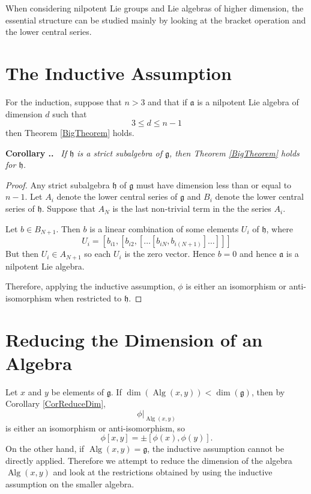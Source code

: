 \documentclass[honours]{UNSWthesis}
\newcommand{\g}{\mathfrak{g}}
\newcommand{\1}{\mathbf{e}_{1}}
\newcommand{\2}{\mathbf{e}_{3}}
\newcommand{\3}{\mathbf{e}_{3}}
\DeclareMathOperator{\alg}{Alg}
\newcounter{Item}[section]
\newenvironment{Corollary}{\medskip
                            \refstepcounter{Item}
                            \noindent
                           {\bf Corollary \thesection.\theItem.}\ %
                            \begingroup \sl}
                           {\endgroup\medskip}
\begin{document}




When considering nilpotent Lie groups and Lie algebras of higher dimension, the essential structure can be studied mainly by looking at the bracket operation and the lower central series.




\section{The Inductive Assumption}
For the induction, suppose that $n > 3$ and that if $\mathfrak{a}$ is a nilpotent Lie algebra of dimension $d$ such that
\[
3 \leq d \leq n-1
\]
then Theorem \ref{BigTheorem} holds. 

\begin{Corollary}\label{CorReduceDim}
If $\mathfrak{h}$ is a strict subalgebra of $\g$, then Theorem \ref{BigTheorem} holds for $\mathfrak{h}$. 
\end{Corollary}

\begin{proof}
Any strict subalgebra $\mathfrak{h}$ of $\g$ must have dimension less than or equal to $n-1$. Let $A_{i}$ denote the lower central series of $\g$ and $B_{i}$ denote the lower central series of $\mathfrak{h}$. Suppose that $A_{N}$ is the last non-trivial term in the the series $A_{i}$. 

Let $b \in B_{N+1}$. Then $b$ is a linear combination of some elements $U_{i}$ of $\mathfrak{h}$, where 
\[
U_{i}=[b_{i1},[b_{i2},[\ldots[b_{iN}, b_{i(N+1)}]\ldots]]]
\]
But then $U_{i} \in A_{N+1}$ so each $U_{i}$ is the zero vector. Hence $b=0$ and hence $\mathfrak{a}$ is a nilpotent Lie algebra. 

Therefore, applying the inductive assumption, $\phi$ is either an isomorphism or anti-isomorphism when restricted to $\mathfrak{h}$.
  
\end{proof}

\section{Reducing the Dimension of an Algebra}
Let $x$ and $y$ be elements of $\g$. If $\dim(\alg(x,y)) < \dim(\g)$, then by Corollary \ref{CorReduceDim}, 
\[\phi|_{\alg(x,y)}
\]
is either an isomorphism or anti-isomorphism, so 
\[
\phi[x,y]= \pm [\phi(x),\phi(y)].
\] 
On the other hand, if $\alg(x,y)=\g$, the inductive assumption cannot be directly applied. Therefore we attempt to reduce the dimension of the algebra $\alg(x,y)$ and look at the restrictions obtained by using the inductive assumption on the smaller algebra. \newline 
\end{document}
